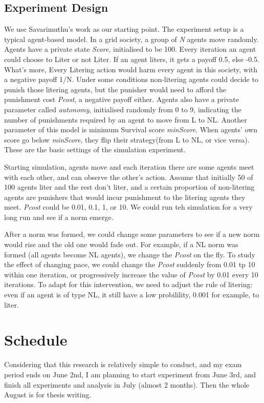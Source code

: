 \documentclass[12pt]{extarticle}
\begin{document}
\subsection{Experiment Design}
We use Savarimuthu's work as our starting point. The experiment setup is a typical agent-based model. In a grid society, a group of \textit{N} agents move randomly. Agents have a private state \textit{Score}, initialised to be 100. Every iteration an agent could choose to Liter or not Liter. If an agent liters, it gets a payoff 0.5, else -0.5. What's more, Every Litering action would harm every agent in this society, with a negative payoff 1/N. Under some conditions non-litering agents could decide to punish those litering agents, but the punisher would need to afford the punishment cost \textit{Pcost}, a negative payoff either. Agents also have a private parameter called \textit{autonomy}, initialised randomly from 0 to 9, indicating the number of punishments required by an agent to move from L to NL. Another parameter of this model is minimum Survival score \textit{minScore}. When agents' own score go below \textit{minScore}, they flip their strategy(from L to NL, or vice versa). These are the basic settings of the simulation experiment.

Starting simulation, agents move and each iteration there are some agents meet with each other, and can observe the other's action. Assume that initially 50 of 100 agents liter and the rest don't liter, and a certain proportion of non-litering agents are punishers that would incur punishment to the litering agents they meet. \textit{Pcost} could be 0.01, 0.1, 1, or 10. We could run teh simulation for a very long run and see if a norm emerge.

After a norm was formed, we could change some parameters to see if a new norm would rise and the old one would fade out. For example, if a NL norm was formed (all agents become NL agents), we change the \textit{Pcost} on the fly. To study the effect of changing pace, we could change the \textit{Pcost} suddenly from 0.01 tp 10 within one iteration, or progressively increase the value of \textit{Pcost} by 0.01 every 10 iterations. To adapt for this intervention, we need to adjust the rule of litering: even if an agent is of type NL, it still have a low probilility, 0.001 for example, to liter.  


\section{Schedule}
Considering that this research is relatively simple to conduct, and my exam period ends on June 2nd, I am planning to start experiment from June 3rd, and finish all experiments and analysis in July (almost 2 months). Then the whole August is for thesis writing.




\end{document}
